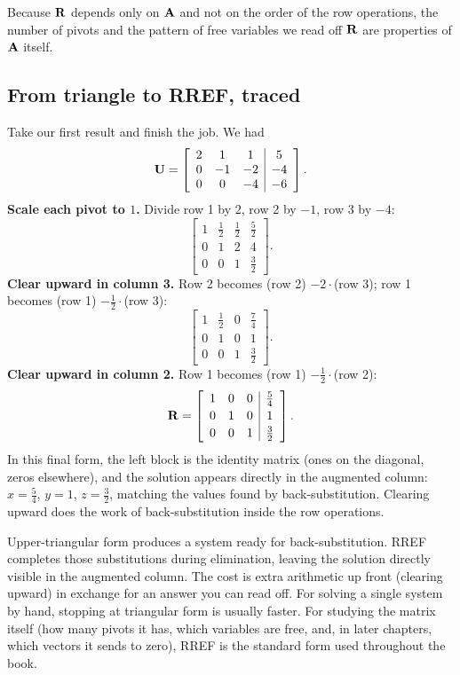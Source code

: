 Because $\mathbf{R}$ depends only on $\mathbf{A}$ and not on the order of the row
operations, the number of pivots and the pattern of free variables we read off
$\mathbf{R}$ are properties of $\mathbf{A}$ itself.

\subsection{From triangle to RREF, traced}

Take our first result and finish the job. We had
\[
\mathbf{U}=\left[\begin{array}{ccc|c}
2 & 1 & 1 & 5\\
0 & -1 & -2 & -4\\
0 & 0 & -4 & -6
\end{array}\right].
\]
\textbf{Scale each pivot to $1$.} Divide row 1 by $2$, row 2 by $-1$, row 3 by
$-4$:
\[
\left[\begin{array}{ccc|c}
1 & \tfrac12 & \tfrac12 & \tfrac52\\[2pt]
0 & 1 & 2 & 4\\[2pt]
0 & 0 & 1 & \tfrac32
\end{array}\right].
\]
\textbf{Clear upward in column 3.} Row 2 becomes (row 2) $-2\cdot$(row 3); row 1
becomes (row 1) $-\tfrac12\cdot$(row 3):
\[
\left[\begin{array}{ccc|c}
1 & \tfrac12 & 0 & \tfrac74\\[2pt]
0 & 1 & 0 & 1\\[2pt]
0 & 0 & 1 & \tfrac32
\end{array}\right].
\]
\textbf{Clear upward in column 2.} Row 1 becomes (row 1) $-\tfrac12\cdot$(row 2):
\[
\mathbf{R}=\left[\begin{array}{ccc|c}
1 & 0 & 0 & \tfrac54\\[2pt]
0 & 1 & 0 & 1\\[2pt]
0 & 0 & 1 & \tfrac32
\end{array}\right].
\]
In this final form, the left block is the identity matrix (ones on the diagonal,
zeros elsewhere), and the
solution appears directly in the augmented column: $x=\tfrac54$,
$y=1$, $z=\tfrac32$, matching the values found by back-substitution.
Clearing upward does the work of back-substitution inside the row operations.

\begin{intuitionbox}
Upper-triangular form produces a system ready for back-substitution. RREF
completes those substitutions during elimination, leaving the solution directly
visible in the augmented column. The cost is extra arithmetic up front
(clearing upward) in exchange for an answer you can read off. For solving a single
system by hand, stopping at triangular form is usually faster. For studying the
matrix itself (how many pivots it has, which variables are free, and, in later
chapters, which vectors it sends to zero), RREF is the standard form used
throughout the book.
\end{intuitionbox}

